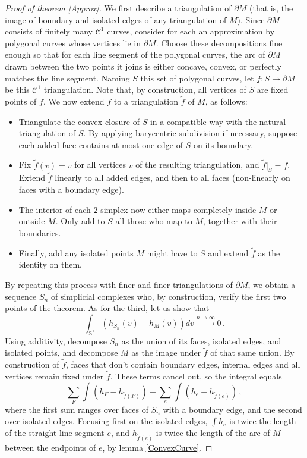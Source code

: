 \documentclass[a4paper]{article}
\newcommand{\bb}{\mathbb}
\begin{document}
\begin{proof}[Proof of theorem \ref{Approx}]
	We first describe a triangulation of $\partial M$ (that is, the image of boundary and isolated edges of any triangulation of $M$). Since $\partial M$ consists of finitely many $\mathcal C^1$ curves, consider for each an approximation by polygonal curves whose vertices lie in $\partial M$. Choose these decompositions fine enough so that for each line segment of the polygonal curves, the arc of $\partial M$ drawn between the two points it joins is either concave, convex, or perfectly matches the line segment. Naming $S$ this set of polygonal curves, let $f: S \to \partial M$ be this $\mathcal C^1$ triangulation. Note that, by construction, all vertices of $S$ are fixed points of $f$. We now extend $f$ to a triangulation $\tilde f$ of $M$, as follows:
	\begin{itemize}
		\item Triangulate the convex closure of $S$ in a compatible way with the natural triangulation of $S$. By applying barycentric subdivision if necessary, suppose each added face contains at most one edge of $S$ on its boundary.
		\item Fix $\tilde f(v) = v$ for all vertices $v$ of the resulting triangulation, and $\tilde f|_{S}=f$. Extend $\tilde f$ linearly to all added edges, and then to all faces (non-linearly on faces with a boundary edge).
		\item The interior of each $2$-simplex now either maps completely inside $M$ or outside $M$. Only add to $S$ all those who map to $M$, together with their boundaries.
		\item Finally, add any isolated points $M$ might have to $S$ and extend $\tilde f$ as the identity on them.
	\end{itemize}
	
	By repeating this process with finer and finer triangulations of $\partial M$, we obtain a sequence $S_n$ of simplicial complexes who, by construction, verify the first two points of the theorem. As for the third, let us show that
	\[ \int_{\bb S^{1}} (h_{S_n}(v)-h_{M}(v))  dv \overset{n \to \infty} \longrightarrow 0\, .\]
	Using additivity, decompose $S_n$ as the union of its faces, isolated edges, and isolated points, and decompose $M$ as the image under $\tilde f$ of that same union. By construction of $\tilde f$, faces that don't contain boundary edges, internal edges and all vertices remain fixed under $\tilde f$. These terms cancel out, so the integral equals
	\[ \sum_{F} \int(h_F -h_{\tilde f(F)}) + \sum_{e} \int(h_e -h_{\tilde f(e)})\, , \]
	where the first sum ranges over faces of $S_n$ with a boundary edge, and the second over isolated edges. Focusing first on the isolated edges, $\int h_e$ is twice the length of the straight-line segment $e$, and $h_{\tilde f(e)}$ is twice the length of the arc of $M$ between the endpoints of $e$, by lemma \ref{ConvexCurve}.
	

\end{proof}
\end{document}
